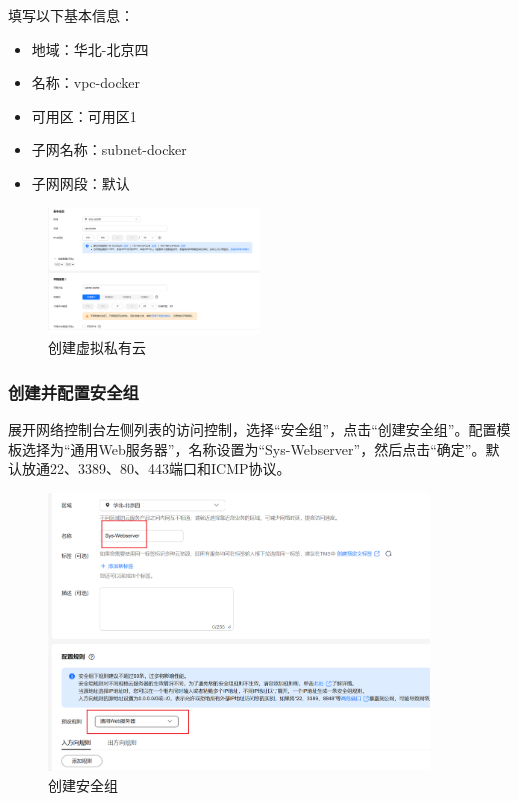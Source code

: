 \documentclass{article}
\begin{document}
填写以下基本信息：

\begin{itemize}[noitemsep]
    \item 地域：华北-北京四
    \item 名称：vpc-docker
    \item 可用区：可用区1
    \item 子网名称：subnet-docker
    \item 子网网段：默认
\end{itemize}

\begin{figure}[H]
\centering
\includegraphics[width=0.5\textwidth]{img/1.1.png}
\caption{创建虚拟私有云}
\end{figure}

\subsubsection{创建并配置安全组}

展开网络控制台左侧列表的访问控制，选择“安全组”，点击“创建安全组”。配置模板选择为“通用Web服务器”，名称设置为“Sys-Webserver”，然后点击“确定”。默认放通22、3389、80、443端口和ICMP协议。

\begin{figure}[H]
\centering
\includegraphics[width=0.9\textwidth]{img/1.2.png}
\caption{创建安全组}
\end{figure}
\end{document}
